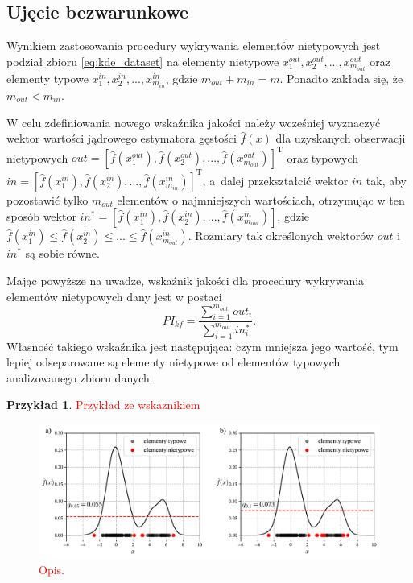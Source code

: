 \documentclass[12pt,a4paper,oneside]{book}
\theoremstyle{definition}
\newtheorem{exmp}{Przykład}[chapter]
\begin{document}
\subsection*{Ujęcie bezwarunkowe}

Wynikiem zastosowania procedury wykrywania elementów nietypowych jest podział zbioru \eqref{eq:kde_dataset} na elementy nietypowe $x_1^{out}, x_2^{out},...,x_{m_{out}}^{out}$ oraz elementy typowe $x_1^{in}, x_2^{in},...,x_{m_{in}}^{in}$, gdzie $m_{out}+m_{in}=m$. Ponadto zakłada się, że $m_{out} < m_{in}$.

W celu zdefiniowania nowego wskaźnika jakości należy wcześniej wyznaczyć wektor wartości jądrowego estymatora gęstości $\hat{f}(x)$ dla uzyskanych obserwacji nietypowych $out=[\hat{f}(x_1^{out}), \hat{f}(x_2^{out}),..., \hat{f}(x_{m_{out}}^{out})]^\mathrm{T}$ oraz typowych $in=[\hat{f}(x_1^{in}), \hat{f}(x_2^{in}),..., \hat{f}(x_{m_{in}}^{in})]^\mathrm{T}$, a~dalej przekształcić wektor $in$ tak, aby pozostawić tylko $m_{out}$ elementów o najmniejszych wartościach, otrzymując w ten sposób wektor $in^*=[\hat{f}(x_1^{in}), \hat{f}(x_2^{in}),..., \hat{f}(x_{m_{out}}^{in})]$, gdzie $\hat{f}(x_1^{in}) \leq \hat{f}(x_2^{in}) \leq ... \leq \hat{f}(x_{m_{out}}^{in})$. Rozmiary tak określonych wektorów $out$ i $in^*$ są sobie równe.

Mając powyższe na uwadze, wskaźnik jakości dla procedury wykrywania elementów nietypowych dany jest w postaci
\begin{equation}
PI_{kf} = \frac{\sum_{i=1}^{m_{out}} out_i}{\sum_{i=1}^{m_{out}} in_i^*}.
\end{equation}
Własność takiego wskaźnika jest następująca: czym mniejsza jego wartość, tym lepiej odseparowane są elementy nietypowe od elementów typowych analizowanego zbioru danych.

\begin{exmp}
\textcolor{red}{Przykład ze wskaznikiem}
\begin{figure}[H]
    \centering
    \includegraphics[scale=0.6]{outliers_detection_example_eval}
    \vspace{-0.5cm} 
    \caption{\textcolor{red}{Opis.}}
\end{figure}
\end{exmp}
\end{document}
